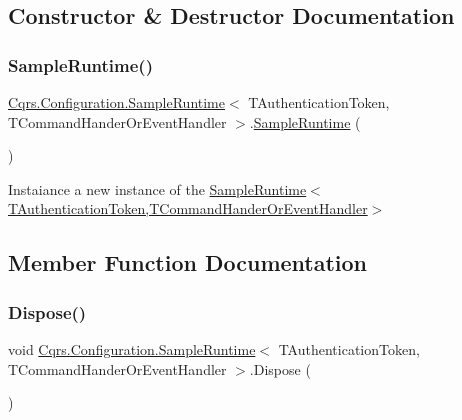 \subsection{Constructor \& Destructor Documentation}
\mbox{\label{classCqrs_1_1Configuration_1_1SampleRuntime_a9382e8b20b8701815ad20c1cd645c27b_a9382e8b20b8701815ad20c1cd645c27b}} 
\subsubsection{\texorpdfstring{Sample\+Runtime()}{SampleRuntime()}}
{\footnotesize\ttfamily \hyperlink{classCqrs_1_1Configuration_1_1SampleRuntime}{Cqrs.\+Configuration.\+Sample\+Runtime}$<$ T\+Authentication\+Token, T\+Command\+Hander\+Or\+Event\+Handler $>$.\hyperlink{classCqrs_1_1Configuration_1_1SampleRuntime}{Sample\+Runtime} (\begin{DoxyParamCaption}{ }\end{DoxyParamCaption})}



Instaiance a new instance of the \hyperlink{classCqrs_1_1Configuration_1_1SampleRuntime_a9382e8b20b8701815ad20c1cd645c27b_a9382e8b20b8701815ad20c1cd645c27b}{Sample\+Runtime$<$\+T\+Authentication\+Token,\+T\+Command\+Hander\+Or\+Event\+Handler$>$} 



\subsection{Member Function Documentation}
\mbox{\label{classCqrs_1_1Configuration_1_1SampleRuntime_ae3729c9e4d130fb2e0c88246d58dc761_ae3729c9e4d130fb2e0c88246d58dc761}} 
\subsubsection{\texorpdfstring{Dispose()}{Dispose()}}
{\footnotesize\ttfamily void \hyperlink{classCqrs_1_1Configuration_1_1SampleRuntime}{Cqrs.\+Configuration.\+Sample\+Runtime}$<$ T\+Authentication\+Token, T\+Command\+Hander\+Or\+Event\+Handler $>$.Dispose (\begin{DoxyParamCaption}{ }\end{DoxyParamCaption})}




